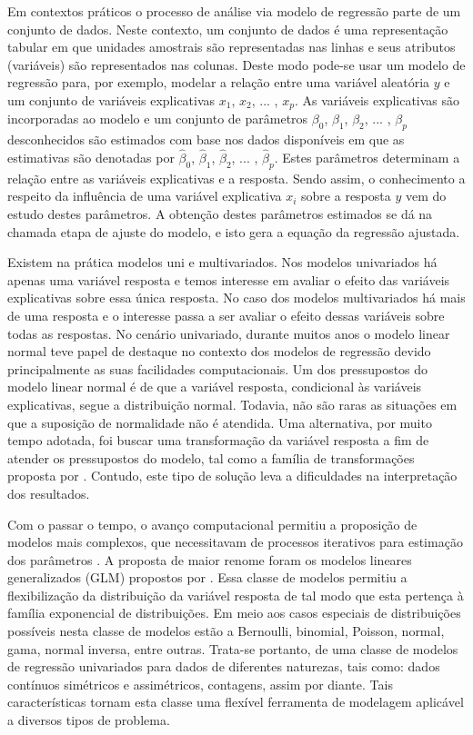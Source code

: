 Em contextos práticos o processo de análise via modelo de regressão parte de um conjunto de dados. Neste contexto, um conjunto de dados é uma representação tabular em que unidades amostrais são representadas nas linhas e seus atributos (variáveis) são representados nas colunas. Deste modo pode-se usar um modelo de regressão para, por exemplo, modelar a relação entre uma variável aleatória $y$ e um conjunto de variáveis explicativas $x_1$, $x_2$, ... , $x_p$. As variáveis explicativas são incorporadas ao modelo e um conjunto de parâmetros $\beta_0$, $\beta_1$, $\beta_2$, ... , $\beta_p$ desconhecidos são estimados com base nos dados disponíveis em que as estimativas são denotadas por $\hat\beta_0$, $\hat\beta_1$, $\hat\beta_2$, ... , $\hat\beta_p$. Estes parâmetros determinam a relação entre as variáveis explicativas e a resposta. Sendo assim, o conhecimento a respeito da influência de uma variável explicativa $x_i$ sobre a resposta $y$ vem do estudo destes parâmetros. A obtenção destes parâmetros estimados se dá na chamada etapa de ajuste do modelo, e isto gera a equação da regressão ajustada.

Existem na prática modelos uni e multivariados. Nos modelos univariados há apenas uma variável resposta e temos interesse em avaliar o efeito das variáveis explicativas sobre essa única resposta. No caso dos modelos multivariados há mais de uma resposta e o interesse passa a ser avaliar o efeito dessas variáveis sobre todas as respostas. No cenário univariado, durante muitos anos o modelo linear normal \citep{galton} teve papel de destaque no contexto dos modelos de regressão devido principalmente as suas facilidades computacionais. Um dos pressupostos do modelo linear normal é de que a variável resposta, condicional às variáveis explicativas, segue a distribuição normal. Todavia, não são raras as situações em que a suposição de normalidade não é atendida. Uma alternativa, por muito tempo adotada, foi buscar uma transformação da variável resposta a fim de atender os pressupostos do modelo, tal como a família de transformações proposta por \citet{boxcox64}. Contudo, este tipo de solução leva a dificuldades na interpretação dos resultados.

Com o passar o tempo, o avanço computacional permitiu a proposição de modelos mais complexos, que necessitavam de processos iterativos para estimação dos parâmetros \citep{paula}. A proposta de maior renome foram os modelos lineares generalizados (GLM) propostos por \citet{Nelder72}. Essa classe de modelos permitiu a flexibilização da distribuição da variável resposta de tal modo que esta pertença à família exponencial de distribuições. Em meio aos casos especiais de distribuições possíveis nesta classe de modelos estão a Bernoulli, binomial, Poisson, normal, gama, normal inversa, entre outras. Trata-se portanto, de uma classe de modelos de regressão univariados para dados de diferentes naturezas, tais como: dados contínuos simétricos e assimétricos, contagens, assim por diante. Tais características tornam esta classe uma flexível ferramenta de modelagem aplicável a diversos tipos de problema. 

